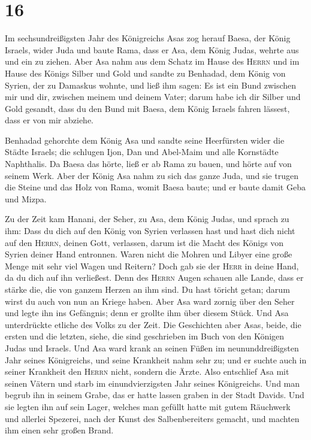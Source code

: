 \hypertarget{section-15}{%
\section{16}\label{section-15}}

 Im sechsundreißigsten Jahr des Königreichs Asas zog
herauf Baesa, der König Israels, wider Juda und baute Rama, dass er Asa,
dem König Judas, wehrte aus und ein zu ziehen.  Aber Asa
nahm aus dem Schatz im Hause des \textsc{Herrn} und im Hause des Königs
Silber und Gold und sandte zu Benhadad, dem König von Syrien, der zu
Damaskus wohnte, und ließ ihm sagen:  Es ist ein Bund
zwischen mir und dir, zwischen meinem und deinem Vater; darum habe ich
dir Silber und Gold gesandt, dass du den Bund mit Baesa, dem König
Israels fahren lässest, dass er von mir abziehe.

 Benhadad gehorchte dem König Asa und sandte seine
Heerfürsten wider die Städte Israels; die schlugen Ijon, Dan und
Abel-Maim und alle Kornstädte Naphthalis.  Da Baesa das
hörte, ließ er ab Rama zu bauen, und hörte auf von seinem Werk.
 Aber der König Asa nahm zu sich das ganze Juda, und sie
trugen die Steine und das Holz von Rama, womit Baesa baute; und er baute
damit Geba und Mizpa.

 Zu der Zeit kam Hanani, der Seher, zu Asa, dem König
Judas, und sprach zu ihm: Dass du dich auf den König von Syrien
verlassen hast und hast dich nicht auf den \textsc{Herrn}, deinen Gott,
verlassen, darum ist die Macht des Königs von Syrien deiner Hand
entronnen.  Waren nicht die Mohren und Libyer eine große
Menge mit sehr viel Wagen und Reitern? Doch gab sie der \textsc{Herr} in
deine Hand, da du dich auf ihn verließest.  Denn des
\textsc{Herrn} Augen schauen alle Lande, dass er stärke die, die von
ganzem Herzen an ihm sind. Du hast töricht getan; darum wirst du auch
von nun an Kriege haben.  Aber Asa ward zornig über den
Seher und legte ihn ins Gefängnis; denn er grollte ihm über diesem
Stück. Und Asa unterdrückte etliche des Volks zu der Zeit.
 Die Geschichten aber Asas, beide, die ersten und die
letzten, siehe, die sind geschrieben im Buch von den Königen Judas und
Israels.  Und Asa ward krank an seinen Füßen im
neununddreißigsten Jahr seines Königreichs, und seine Krankheit nahm
sehr zu; und er suchte auch in seiner Krankheit den \textsc{Herrn}
nicht, sondern die Ärzte.  Also entschlief Asa mit seinen
Vätern und starb im einundvierzigsten Jahr seines Königreichs.
 Und man begrub ihn in seinem Grabe, das er hatte lassen
graben in der Stadt Davids. Und sie legten ihn auf sein Lager, welches
man gefüllt hatte mit gutem Räuchwerk und allerlei Spezerei, nach der
Kunst des Salbenbereiters gemacht, und machten ihm einen sehr großen
Brand.


